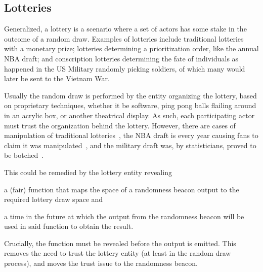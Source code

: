 \subsection{Lotteries}\label{subsec:usecase_lotteries}
Generalized, a lottery is a scenario where a set of actors has some stake in the outcome of a random draw.
Examples of lotteries include traditional lotteries with a monetary prize; lotteries determining a prioritization order, like the annual NBA draft; and conscription lotteries determining the fate of individuals as happened in the US Military randomly picking soldiers, of which many would later be sent to the Vietnam War.

Usually the random draw is performed by the entity organizing the lottery, based on proprietary techniques, whether it be software, ping pong balls flailing around in an acrylic box, or another theatrical display.
As such, each participating actor must trust the organization behind the lottery.
However, there are cases of manipulation of traditional lotteries~\cite{lotteryscandal-eddietipton, lotteryscandal-666}, the NBA draft is every year causing fans to claim it was manipulated~\cite{nbalottery}, and the military draft was, by statisticians, proved to be botched~\cite{starr1997nonrandom}.

This could be remedied by the lottery entity revealing
\begin{eromanate*}
    \item a (fair) function that maps the space of a randomness beacon output to the required lottery draw space and
    \item a time in the future at which the output from the randomness beacon will be used in said function to obtain the result.
\end{eromanate*}
Crucially, the function must be revealed before the output is emitted.
This removes the need to trust the lottery entity (at least in the random draw process), and moves the trust issue to the randomness beacon.
